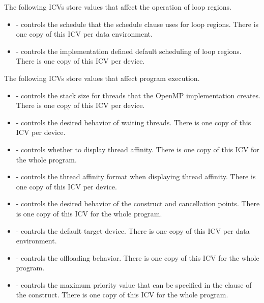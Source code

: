 The following ICVs store values that affect the operation of loop regions.

\begin{itemize}
\item {} - controls the schedule that the  schedule clause uses for
loop regions. There is one copy of this ICV per data environment.

\item {} - controls the implementation defined default scheduling of loop
regions. There is one copy of this ICV per device.
\end{itemize}

The following ICVs store values that affect program execution.

\begin{itemize}
\item {} - controls the stack size for threads that the OpenMP implementation
creates. There is one copy of this ICV per device.

\item {} - controls the desired behavior of waiting threads. There is one copy
of this ICV per device.

\item {} - controls whether to display thread affinity. There is one copy of this ICV for the whole program.

\item {} - controls the thread affinity format when displaying thread affinity. There is one copy of this ICV per device.

\item {} - controls the desired behavior of the  construct and cancellation
points. There is one copy of this ICV for the whole program.

\item {} - controls the default target device. There is one copy of this ICV
per data environment.

\item {} - controls the offloading behavior. There is one copy of this ICV
for the whole program.

\item {} - controls the maximum priority value that can be specified in the
 clause of the  construct. There is one copy of this ICV for the whole program.

\end{itemize}

